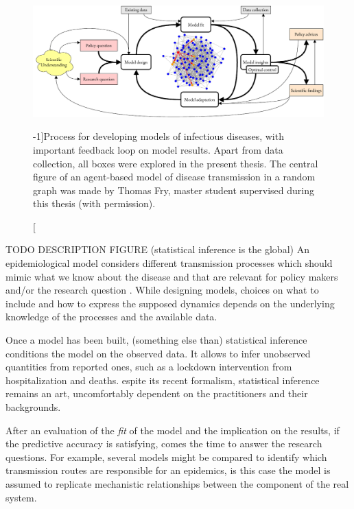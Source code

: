 \begin{figure}\centering
  \includegraphics{fig/modeling_cycle_new}
  \caption[Process for infectious disease modeling][-1\baselineskip]{Process for developing models of infectious diseases, with important feedback loop on model results. Apart from data collection, all boxes were explored in the present thesis. The central figure of an agent-based model of disease transmission in a random graph was made by Thomas Fry,  master student supervised during this thesis (with permission).}\label{fig:modeling}
\end{figure}

TODO DESCRIPTION FIGURE (statistical inference is the global)
An epidemiological model considers different transmission processes which should mimic what we know about the disease and that are relevant for policy makers and/or the research question
.
While designing models, choices on what to include and how to express the supposed dynamics depends on the underlying knowledge of the processes and the available data. 

Once a model has been built, (something else than) statistical inference conditions the model on the observed data. It allows to infer unobserved quantities from reported ones, such as a lockdown intervention from hospitalization and deaths. 
espite its recent formalism, statistical inference remains an art, uncomfortably dependent on the practitioners and their backgrounds.

After an evaluation of the \textit{fit} of the model and the implication on the results, if the predictive accuracy is satisfying, comes the time to answer the research questions. For example, several models might be compared to identify which transmission routes are responsible for an epidemics, is this case the model is assumed to replicate mechanistic relationships between the component of the real system.


